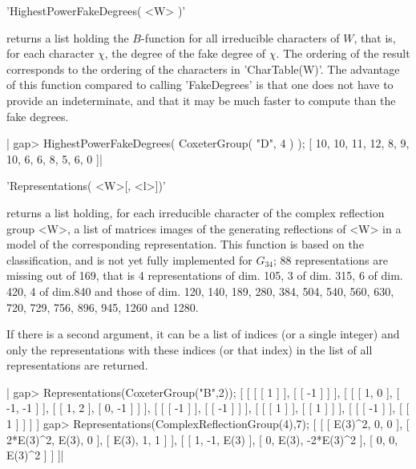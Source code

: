 
'HighestPowerFakeDegrees( <W> )'

returns a list  holding the $B$-function for  all irreducible characters
of  $W$, that  is, for  each character  $\chi$, the  degree of  the fake
degree of $\chi$. The ordering of the result corresponds to the ordering
of  the characters  in 'CharTable(W)'.  The advantage  of this  function
compared to calling  'FakeDegrees' is that one does not  have to provide
an indeterminate,  and that it  may be much  faster to compute  than the
fake degrees.

|    gap> HighestPowerFakeDegrees( CoxeterGroup( "D", 4 ) );
    [ 10, 10, 11, 12, 8, 9, 10, 6, 6, 8, 5, 6, 0 ]|


'Representations( <W>[, <l>])'

returns  a  list  holding,  for  each  irreducible character of the complex
reflection  group  <W>,  a  list  of  matrices  images  of  the  generating
reflections  of <W>  in a  model of  the corresponding representation. This
function  is based on the classification,  and is not yet fully implemented
for  $G_{34}$;  88  representations  are  missing  out  of  169,  that is 4
representations of dim. 105, 3 of dim. 315, 6 of dim. 420, 4 of dim.840 and
those  of dim. 120, 140, 189, 280, 384,  504, 540, 560, 630, 720, 729, 756,
896, 945, 1260 and 1280.

If  there is a  second argument, it  can be a  list of indices (or a single
integer) and only the representations with these indices (or that index) in
the list of all representations are returned.

|    gap> Representations(CoxeterGroup("B",2));
    [ [ [ [ 1 ] ], [ [ -1 ] ] ],
      [ [ [ 1, 0 ], [ -1, -1 ] ], [ [ 1, 2 ], [ 0, -1 ] ] ],
      [ [ [ -1 ] ], [ [ -1 ] ] ], [ [ [ 1 ] ], [ [ 1 ] ] ],
      [ [ [ -1 ] ], [ [ 1 ] ] ] ]
    gap> Representations(ComplexReflectionGroup(4),7);
    [ [ [ E(3)^2, 0, 0 ], [ 2*E(3)^2, E(3), 0 ], [ E(3), 1, 1 ] ],
      [ [ 1, -1, E(3) ], [ 0, E(3), -2*E(3)^2 ], [ 0, 0, E(3)^2 ] ] ]|


